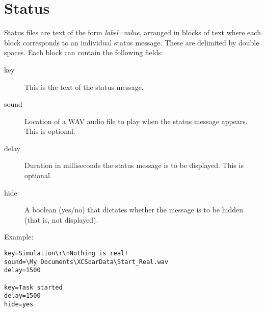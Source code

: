 \section{Status}\label{sec:status}

Status files are text of the form {\em label=value}, arranged in
blocks of text where each block corresponds to an individual status
message.  These are delimited by double spaces.  Each block can
contain the following fields:
\begin{description}
\item[key]  This is the text of the status message.
\item[sound] Location of a WAV audio file to play when the status
  message appears.  This is optional.
\item[delay] Duration in milliseconds the status message is
  to be displayed.  This is optional.
\item[hide] A boolean (yes/no) that dictates whether the message
 is to be hidden (that is, not displayed). 
\end{description} 

Example:
\begin{verbatim}
key=Simulation\r\nNothing is real!
sound=\My Documents\XCSoarData\Start_Real.wav
delay=1500

key=Task started
delay=1500
hide=yes
\end{verbatim}
% 

